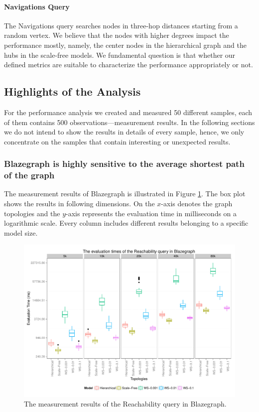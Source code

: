 \paragraph{Navigations Query}

The Navigations query searches nodes in three-hop distances starting from a random vertex. We believe that the nodes with higher degrees impact the performance mostly, namely, the center nodes in the hierarchical graph and the hubs in the scale-free models. We fundamental question is that whether our defined metrics are suitable to characterize the performance appropriately or not.

\subsection{Highlights of the Analysis}

For the performance analysis we created and measured 50 different samples, each of them contains 500 observations---\ie measurement results. In the following sections we do not intend to show the results in details of every sample, hence, we only concentrate on the samples that contain interesting or unexpected results.

\subsubsection{Blazegraph is highly sensitive to the average shortest path of the graph}

The measurement results of Blazegraph is illustrated in Figure \ref{fig:blazeq1}. The box plot~\cite{boxplot} shows the results in following dimensions. On the $x$-axis denotes the graph topologies and the $y$-axis represents the evaluation time in milliseconds on a logarithmic scale. Every column includes different results belonging to a specific model size.

\begin{figure}[!ht]
	\centering
	\includegraphics[width=160mm, keepaspectratio]{figures/blaze_q1.pdf}
	\caption{The measurement results of the Reachability query in Blazegraph.}
	\label{fig:blazeq1}
\end{figure}

